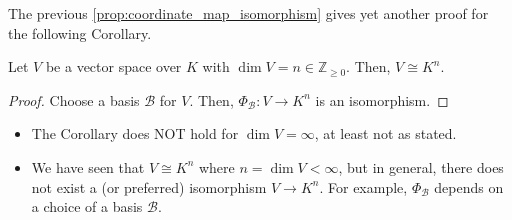 \begin{remark}
The previous \cref{prop:coordinate_map_isomorphism} gives yet another proof for the following Corollary.
\end{remark}

\begin{corollary}
\label{cor:vs_isomorphic_to_kn}
Let $V$ be a vector space over $K$ with $\dim V = n \in \mathbb{Z}_{\ge 0}$. Then, $V \cong K^n$.
\end{corollary}

\begin{proof}
Choose a basis $\mathcal{B}$ for $V$. Then, $\Phi_{\mathcal{B}}: V \to K^n$ is an isomorphism.
\end{proof}

\begin{remark}
\begin{itemize}
    \item The Corollary does NOT hold for $\dim V = \infty$, at least not as stated.
    \item We have seen that $V \cong K^n$ where $n = \dim V < \infty$, but in general, there does not exist a  (or preferred) isomorphism $V \to K^n$. For example, $\Phi_{\mathcal{B}}$ depends on a choice of a basis $\mathcal{B}$.
\end{itemize}
\end{remark}

